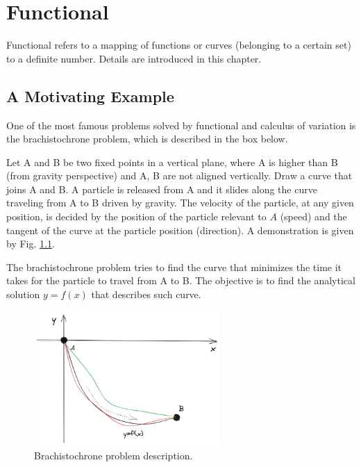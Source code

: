 \chapter{Functional}

Functional refers to a mapping of functions or curves (belonging to a certain set) to a definite number. Details are introduced in this chapter.

\section{A Motivating Example}

One of the most famous problems solved by functional and calculus of variation is the brachistochrone problem, which is described in the box below.

\begin{shortbox}

Let A and B be two fixed points in a vertical plane, where A is higher than B (from gravity perspective) and A, B are not aligned vertically. Draw a curve that joins A and B. A particle is released from A and it slides along the curve traveling from A to B driven by gravity. The velocity of the particle, at any given position, is decided by the position of the particle relevant to $A$ (speed) and the tangent of the curve at the particle position (direction). A demonstration is given by Fig. \ref{ch12fig:brachistochrone_description}.

The brachistochrone problem tries to find the curve that minimizes the time it takes for the particle to travel from A to B. The objective is to find the analytical solution $y=f(x)$ that describes such curve.

\end{shortbox}

\begin{figure}
	\centering
	\includegraphics[width=200pt]{chapters/chapter12/figures/brachistochrone_description.png}
	\caption{Brachistochrone problem description.} \label{ch12fig:brachistochrone_description}
\end{figure}


